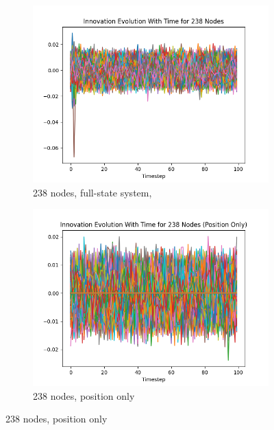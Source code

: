 \documentclass[subscriptcorrection,upint,varvw,barcolor=Goldenrod3,mathalfa=cal=euler,balance,hyphenate,french,pdf-a, nofoot]{asmejour} %
\begin{document}
\begin{figure}[ht]
    \centering
    \begin{subfigure}[b]{0.32\linewidth}
        \includegraphics[width=\linewidth]{CLOTH REPORT PICS/innovation 238.jpg}
        \caption{238 nodes, full-state system,}
        \label{fig:innovation-238-full}
    \end{subfigure}
    \hfill %
    \begin{subfigure}[b]{0.32\linewidth}
        \includegraphics[width=\linewidth]{CLOTH REPORT PICS/innovation 238p.jpg}
        \caption{238 nodes, position only}
        \label{fig:innovation-238-pos}
    \end{subfigure}

\end{figure}
\end{document}
